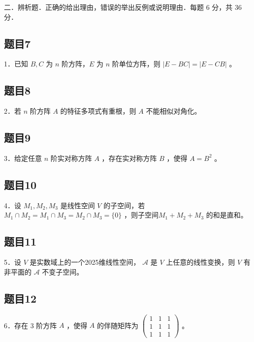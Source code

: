 \documentclass{article}
\begin{document}
二．辨析题．正确的给出理由，错误的举出反例或说明理由．每题 6 分，共 36 分．\\

\subsection{题目7}
1．已知 \(B, C\) 为 \(n\) 阶方阵，\(E\) 为 \(n\) 阶单位方阵，则 \(|E-B C|=|E-C B|\) 。

\subsection{题目8}
2．若 \(n\) 阶方阵 \(A\) 的特征多项式有重根，则 \(A\) 不能相似对角化。

\subsection{题目9}
3．给定任意 \(n\) 阶实对称方阵 \(A\) ，存在实对称方阵 \(B\) ，使得 \(A=B^{2}\) 。

\subsection{题目10}
4．设 \(M_{1}, M_{2}, M_{3}\) 是线性空间 \(V\) 的子空间，若 \(M_{1} \cap M_{2}=M_{1} \cap M_{3}=M_{2} \cap M_{3}=\{0\}\) ，则子空间\(M_{1}+M_{2}+M_{3}\) 的和是直和。

\subsection{题目11}
5．设 \(V\) 是实数域上的一个2025维线性空间， \(\mathcal{A}\) 是 \(V\) 上任意的线性变换，则 \(V\) 有非平面的 \(\mathcal{A}\) 不变子空间。

\subsection{题目12}
6．存在 3 阶方阵 \(A\) ，使得 \(A\) 的伴随矩阵为 \(\left(\begin{array}{lll}1 & 1 & 1 \\ 1 & 1 & 1 \\ 1 & 1 & 1\end{array}\right)\) 。
\end{document}
